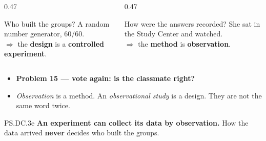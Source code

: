 \documentclass[aspectratio=169, 11pt]{beamer}
\newcommand{\redink}[1]{{\color{redacc}\bfseries #1}}
\begin{document}
\begin{frame}[t, plain]
  \vspace{4pt}
  \begin{columns}[t]
    \begin{column}{0.47\textwidth}
      \begin{block}{Who built the groups?}
        A random number generator, 60/60. \\[3pt]
        $\Rightarrow$ the \textbf{design} is a \redink{controlled experiment}.
      \end{block}
    \end{column}
    \begin{column}{0.47\textwidth}
      \begin{block}{How were the answers recorded?}
        She sat in the Study Center and watched. \\[3pt]
        $\Rightarrow$ the \textbf{method} is \redink{observation}.
      \end{block}
    \end{column}
  \end{columns}
  \vspace{10pt}
  \begin{itemize}\setlength{\itemsep}{4pt}
    \item \textbf{Problem 15 --- vote again: is the classmate right?}
    \item \emph{Observation} is a method. An \emph{observational study} is a design. They are
          not the same word twice.
  \end{itemize}
  \begin{block}{PS.DC.3e}
    \textbf{An experiment can collect its data by observation.} How the data arrived
    \redink{never} decides who built the groups.
  \end{block}
\end{frame}
\end{document}
